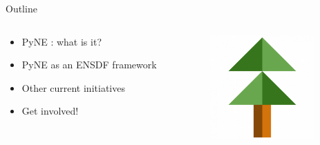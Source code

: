 \documentclass[xcolor=x11names,compress]{beamer}
\renewcommand{\(}{\begin{columns}}
\renewcommand{\)}{\end{columns}}
\newcommand{\<}[1]{\begin{column}{#1}}
\renewcommand{\>}{\end{column}}
\begin{document}
\begin{frame}{Outline}

	\begin{columns}
  	\begin{column}{0.5\textwidth}
	    \begin{itemize}
          \item PyNE \cite{pyne}: what is it?
          \item PyNE as an ENSDF framework
          \item Other current initiatives
          \item Get involved!
	    \end{itemize}
  	\end{column}
 	\begin{column}{0.4\textwidth}
 	   \begin{center}
 	   \begin{figure}
       \includegraphics[height=4cm]{../figs/pyne-icon-big}
	   \end{figure}
 	   \end{center}
  	\end{column}
	\end{columns}

\end{frame}

\end{document}
